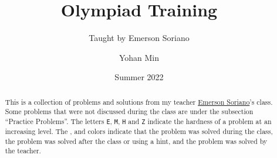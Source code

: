 \documentclass[11pt]{scrartcl}
\title{Olympiad Training}
\subtitle{Taught by Emerson Soriano}
\author{Yohan Min}
\date{Summer 2022}
\begin{document}
\maketitle

\begin{abstract}
	This is a collection of problems and solutions from my teacher \href{https://www.facebook.com/emerson.sorianoperez}{Emerson Soriano}'s class. Some problems that were not discussed during the class are under the subsection ``Practice Problems''. The letters \verb|E|, \verb|M|, \verb|H| and \verb|Z| indicate the hardness of a problem at an increasing level. The ,  and  colors indicate that the problem was solved during the class, the problem was solved after the class or using a hint, and the problem was solved by the teacher.
\end{abstract}

\tableofcontents






\end{document}
